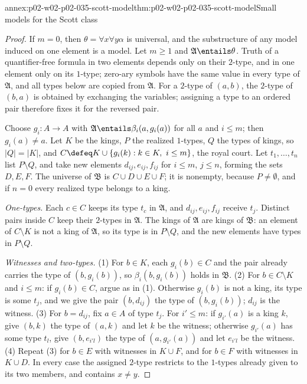 \begin{annexitem}{annex:p02-w02-p02-035-scott-model}{thm:p02-w02-p02-035-scott-model}{Small models for the Scott class}
\begin{proof}
If \(m=0\), then \(\theta=\forall x\forall y\alpha\) is universal, and the
substructure of any model induced on one element is a model.  Let \(m\geq1\)
and \(\mathfrak A\entails\theta\).  Truth of a quantifier-free formula in two
elements depends only on their \(2\)-type, and in one element only on its
\(1\)-type; zero-ary symbols have the same value in every type of
\(\mathfrak A\), and all types below are copied from \(\mathfrak A\).  For a
\(2\)-type of \((a,b)\), the \(2\)-type of \((b,a)\) is obtained by exchanging
the variables; assigning a type to an ordered pair therefore fixes it for the
reversed pair.

Choose \(g_i:A\to A\) with \(\mathfrak A\entails\beta_i(a,g_i(a))\) for all
\(a\) and \(i\leq m\); then \(g_i(a)\neq a\).  Let \(K\) be the kings, \(P\)
the realized \(1\)-types, \(Q\) the types of kings, so \(\lvert Q\rvert=
\lvert K\rvert\), and
\(C\defeq K\cup\{g_i(k):k\in K,\ i\leq m\}\), the royal court.  Let
\(t_1,\ldots,t_n\) list \(P\setminus Q\), and take new elements
\(d_{ij},e_{ij},f_{ij}\) for \(i\leq m\), \(j\leq n\), forming the sets
\(D,E,F\).  The universe of \(\mathfrak B\) is \(C\cup D\cup E\cup F\); it is
nonempty, because \(P\neq\emptyset\), and if \(n=0\) every realized type
belongs to a king.

\emph{One-types.}  Each \(c\in C\) keeps its type \(t_c\) in \(\mathfrak A\),
and \(d_{ij},e_{ij},f_{ij}\) receive \(t_j\).  Distinct pairs inside \(C\)
keep their \(2\)-types in \(\mathfrak A\).  The kings of \(\mathfrak A\) are
kings of \(\mathfrak B\): an element of \(C\setminus K\) is not a king of
\(\mathfrak A\), so its type is in \(P\setminus Q\), and the new elements have
types in \(P\setminus Q\).

\emph{Witnesses and two-types.}  (1) For \(b\in K\), each \(g_i(b)\in C\) and
the pair already carries the type of \((b,g_i(b))\), so
\(\beta_i(b,g_i(b))\) holds in \(\mathfrak B\).  (2) For \(b\in C\setminus
K\) and \(i\leq m\): if \(g_i(b)\in C\), argue as in (1).  Otherwise
\(g_i(b)\) is not a king, its type is some \(t_j\), and we give the pair
\((b,d_{ij})\) the type of \((b,g_i(b))\); \(d_{ij}\) is the witness.  (3) For
\(b=d_{ij}\), fix \(a\in A\) of type \(t_j\).  For \(i'\leq m\): if
\(g_{i'}(a)\) is a king \(k\), give \((b,k)\) the type of \((a,k)\) and let
\(k\) be the witness; otherwise \(g_{i'}(a)\) has some type \(t_l\), give
\((b,e_{i'l})\) the type of \((a,g_{i'}(a))\) and let \(e_{i'l}\) be the
witness.  (4) Repeat (3) for \(b\in E\) with witnesses in \(K\cup F\), and for
\(b\in F\) with witnesses in \(K\cup D\).  In every case the assigned
\(2\)-type restricts to the \(1\)-types already given to its two members, and
contains \(x\neq y\).


\end{proof}
\end{annexitem}
